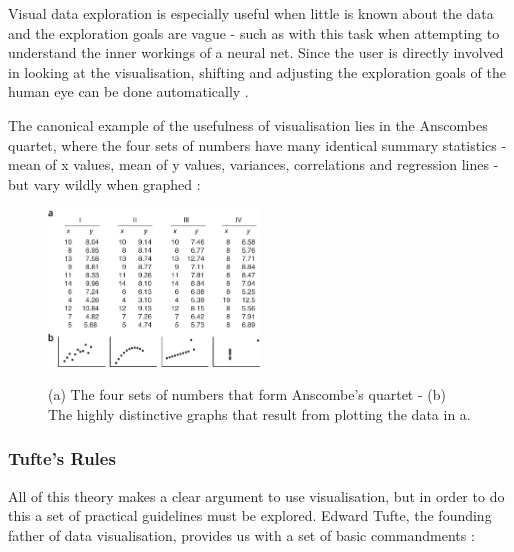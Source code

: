 \documentclass[a4paper,11pt,titlepage]{article}
\begin{document}
		\par 
		Visual data exploration is especially useful when little is known about the data and the exploration goals are vague - such as with this task when attempting to understand the inner workings of a neural net. Since the user is directly involved in looking at the visualisation, shifting and adjusting the exploration goals of the human eye can be done automatically \cite{Keim2002}.
		\par 
		The canonical example of the usefulness of visualisation lies in the Anscombes quartet, where the four sets of numbers have many identical summary statistics - mean of x values, mean of y values, variances, correlations and regression lines - but vary wildly when graphed \cite{Shoresh2011}:

		\begin{figure}[H]
    			\centering	
				{{\includegraphics[width=0.5\textwidth]
    				{img/anscombes_quartet} 
    			}}%
    			\caption{(a) The four sets of numbers that form Anscombe's quartet -  (b) The highly distinctive graphs that result from plotting the data in a.}%
		\end{figure}



\subsubsection{Tufte's Rules}
		\par 
		All of this theory makes a clear argument to use visualisation, but in order to do this a set of practical guidelines must be explored. Edward Tufte, the founding father of data visualisation, provides us with a set of basic commandments \cite{Tufte2001}:		
\end{document}

